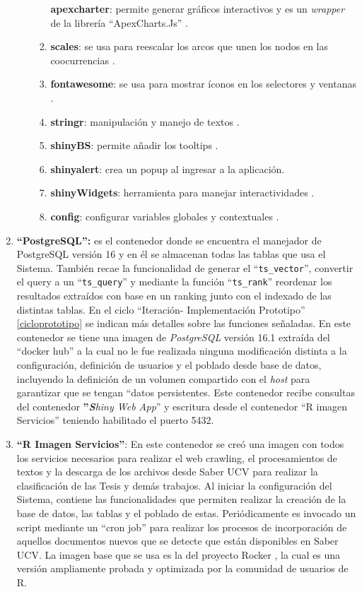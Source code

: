 \documentclass[
  12pt,
  openany]{book}
\begin{document}
\begin{enumerate}
\begin{enumerate}
\begin{enumerate}
      \textbf{apexcharter}: permite generar gráficos interactivos y es un \emph{wrapper} de la librería ``ApexCharts.Js'' \citep{apexcharter}.
    \item
      \textbf{scales}: se usa para reescalar los arcos que unen los nodos en las coocurrencias \citep{scales}.
    \item
      \textbf{fontawesome}: se usa para mostrar íconos en los selectores y ventanas \citep{fontawesome}.
    \item
      \textbf{stringr}: manipulación y manejo de textos \citep{stringr}.
    \item
      \textbf{shinyBS}: permite añadir los tooltips \citep{shinyBS}.
    \item
      \textbf{shinyalert}: crea un popup al ingresar a la aplicación.
    \item
      \textbf{shinyWidgets}: herramienta para manejar interactividades \citep{shinyWidgets}.
    \item
      \textbf{config}: configurar variables globales y contextuales \citep{config}.
    \end{enumerate}
  \end{enumerate}
\item
  \textbf{``PostgreSQL'':} es el contenedor donde se encuentra el manejador de PostgreSQL versión 16 y en él se almacenan todas las tablas que usa el Sistema. También recae la funcionalidad de generar el ``\texttt{ts\_vector}'', convertir el query a un ``\texttt{ts\_query}'' y mediante la función ``\texttt{ts\_rank}'' reordenar los resultados extraídos con base en un ranking junto con el indexado de las distintas tablas. En el ciclo ``Iteración- Implementación Prototipo'' \ref{cicloprototipo} se indican más detalles sobre las funciones señaladas. En este contenedor se tiene una imagen de \emph{PostgreSQL} versión 16.1 extraída del ``docker hub'' a la cual no le fue realizada ninguna modificación distinta a la configuración, definición de usuarios y el poblado desde base de datos, incluyendo la definición de un volumen compartido con el \emph{host} para garantizar que se tengan ``datos persistentes. Este contenedor recibe consultas del contenedor \textbf{''\emph{S}}\emph{hiny Web App}'' y escritura desde el contenedor ``R imagen Servicios'' teniendo habilitado el puerto 5432.
\item
  \textbf{``R Imagen Servicios''}: En este contenedor se creó una imagen con todos los servicios necesarios para realizar el web crawling, el procesamientos de textos y la descarga de los archivos desde Saber UCV para realizar la clasificación de las Tesis y demás trabajos. Al iniciar la configuración del Sistema, contiene las funcionalidades que permiten realizar la creación de la base de datos, las tablas y el poblado de estas. Periódicamente es invocado un script mediante un ``cron job'' para realizar los procesos de incorporación de aquellos documentos nuevos que se detecte que están disponibles en Saber UCV. La imagen base que se usa es la del proyecto Rocker \citep{RJ-2017-065:2017}, la cual es una versión ampliamente probada y optimizada por la comunidad de usuarios de R.


\end{enumerate}
\end{document}
